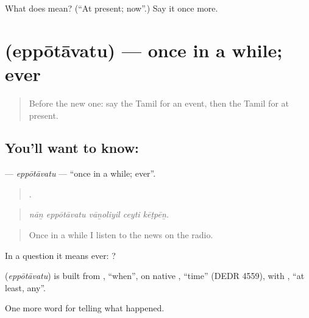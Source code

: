 \begin{tcolorbox}[breakable,colback=teal!4,colframe=teal!35!black,title={Before you move on}]
What does  mean? (\textquotedblleft{}At present; now\textquotedblright{}.) Say it once more.
\end{tcolorbox}
\section[\texorpdfstring{\ta{எப்போதாவது} (eppōtāvatu)}{எப்போதாவது (eppōtāvatu)}]{ (eppōtāvatu) — once in a while; ever}

\label{lesson:TA-C315-eppotavatu}



\begin{quote}
Before the new one: say the Tamil for an event, then the Tamil for at present.
\end{quote}

\subsection*{You'll want to know: }
\textbf{} — \emph{eppōtāvatu} — \textquotedblleft{}once in a while; ever\textquotedblright{}.

\begin{quote}
    .
\end{quote}

\begin{quote}
\emph{nāṉ eppōtāvatu vāṉoliyil ceyti kēṭpēṉ.}
\end{quote}

\begin{quote}
Once in a while I listen to the news on the radio.
\end{quote}

In a question it means ever:  ?

\begin{cousinweb}
\textbf{} (\emph{eppōtāvatu}) is built from , \textquotedblleft{}when\textquotedblright{}, on native , \textquotedblleft{}time\textquotedblright{} (DEDR 4559), with , \textquotedblleft{}at least, any\textquotedblright{}.
\end{cousinweb}

\begin{grammarlens}[title={What you've built}]
One more word for telling what happened.
\end{grammarlens}


